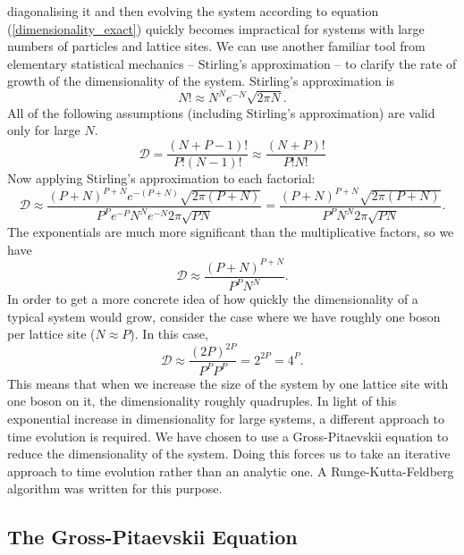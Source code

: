 \documentclass[a4paper, 10pt, draft]{article}
\theoremstyle{plain}
\begin{document}
diagonalising it and then evolving the system according to equation
(\ref{dimensionality_exact}) quickly becomes impractical for systems with large
numbers of particles and lattice sites. We can use another familiar tool from
elementary statistical mechanics -- Stirling's approximation -- to clarify the
rate of growth of the dimensionality of the system. Stirling's
approximation \cite{Schroeder2007} is
\begin{equation}
    N! \approx N^{N} e^{-N} \sqrt{2 \pi N}.
\end{equation}
All of the following assumptions (including Stirling's approximation) are
valid only for large $N$.
\begin{equation*}
    \mathcal{D} = \frac{(N + P - 1)!}{P! (N-1)!}
    \approx
    \frac{(N + P)!}{P! N!}
\end{equation*}
Now applying Stirling's approximation to each factorial:
\begin{equation*}
    \mathcal{D}
    \approx
    \frac{(P + N)^{P+N} e^{-(P + N)} \sqrt{2 \pi (P+N)}}
         {P^{P} e^{-P} N^{N} e^{-N} 2 \pi \sqrt{PN}}
    =
    \frac{(P + N)^{P+N} \sqrt{2 \pi (P+N)}}
         {P^{P} N^{N} 2\pi \sqrt{PN}}.
\end{equation*}
The exponentials are much more significant than the multiplicative factors,
so we have
\begin{equation*}
    \mathcal{D} \approx \frac{(P + N)^{P+N}}{P^P N^N}.
\end{equation*}
In order to get a more concrete idea of how quickly the dimensionality of a
typical system would grow, consider the case where we have roughly one boson
per lattice site ($N \approx P$). In this case,
\begin{equation*}
    \mathcal{D} \approx \frac{(2P)^{2P}}{P^{P} P^{P}} = 2^{2P} = 4^{P}.
\end{equation*}
This means that when we increase the size of the system by one lattice site
with one boson on it, the dimensionality roughly quadruples. In light of
this exponential increase in dimensionality for large systems, a different
approach to time evolution is required. We have chosen to use a
Gross-Pitaevskii equation to reduce the dimensionality of the system. Doing
this forces us to take an iterative approach to time evolution rather than an
analytic one. A Runge-Kutta-Feldberg algorithm \cite{Burden2005} was written
for this purpose.


\subsection{The Gross-Pitaevskii Equation}
\end{document}
